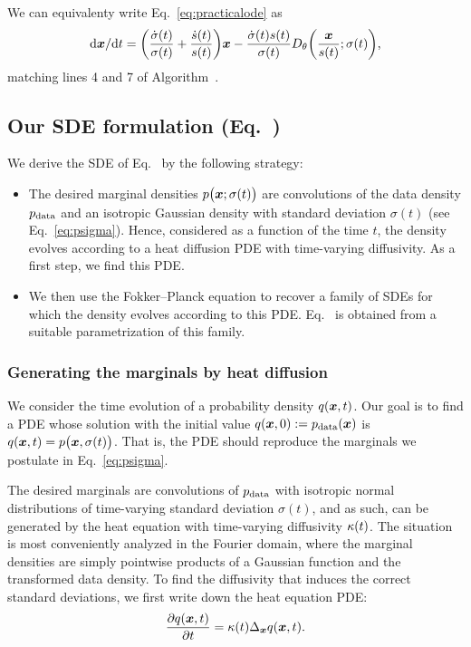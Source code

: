 We can equivalenty write Eq.~\ref{eq:practicalode} as
\begin{equation}
  \mathrm{d}\boldsymbol{x} / \mathrm{d} t = \bigg( \frac{\dot\sigma(t)}{\sigma(t)} + \frac{\dot s(t)}{s(t)} \bigg) \boldsymbol{x} - \frac{\dot\sigma(t) s(t)}{\sigma(t)} D_\theta \bigg( \frac{\boldsymbol{x}}{s(t)}; \sigma(t) \bigg)
  \text{,}
\end{equation}
matching lines 4 and 7 of Algorithm~.

\subsection{Our SDE formulation (Eq.~)}
\label{app:oursde}

We derive the SDE of Eq.~ by the following strategy:
\begin{itemize}
\item
The desired marginal densities $p\big( \boldsymbol{x}; \sigma(t) \big)$ are convolutions of the data density $p_\text{data}$ and an isotropic Gaussian density with standard deviation $\sigma(t)$ (see Eq.~\ref{eq:psigma}). Hence, considered as a function of the time $t$, the density evolves according to a heat diffusion PDE with time-varying diffusivity. As a first step, we find this PDE.%
\item
We then use the Fokker--Planck equation to recover a family of SDEs for which the density evolves according to this PDE. Eq.~ is obtained from a suitable parametrization of this family.
\end{itemize}

\subsubsection{Generating the marginals by heat diffusion}

We consider the time evolution of a probability density $q(\boldsymbol{x}, t)$. Our goal is to find a PDE whose solution with the initial value $q(\boldsymbol{x}, 0) := p_\text{data}(\boldsymbol{x})$ is $q(\boldsymbol{x}, t) = p\big( \boldsymbol{x}, \sigma(t) \big)$. That is, the PDE should reproduce the marginals we postulate in Eq.~\ref{eq:psigma}.

The desired marginals are convolutions of $p_\text{data}$ with isotropic normal distributions of time-varying standard deviation $\sigma(t)$, and as such, can be generated by the heat equation with time-varying diffusivity $\kappa(t)$. The situation is most conveniently analyzed in the Fourier domain, where the marginal densities are simply pointwise products of a Gaussian function and the transformed data density. To find the diffusivity that induces the correct standard deviations, we first write down the heat equation PDE:
\begin{equation}
  \frac{\partial q(\boldsymbol{x}, t)}{\partial t} = \kappa(t) {\Delta_{\boldsymbol{x}}} q(\boldsymbol{x}, t)
  \label{eq:pde}
  \text{.}
\end{equation}


